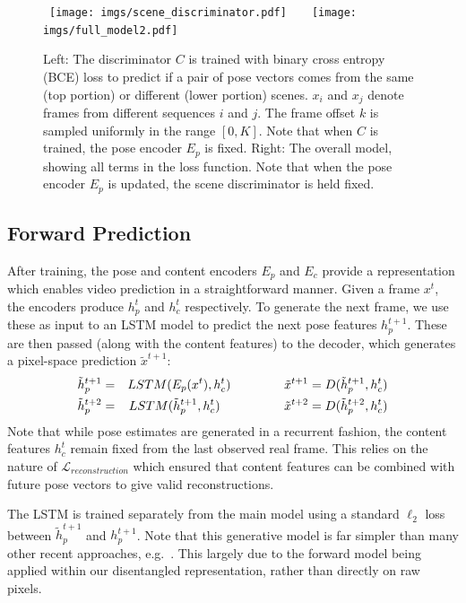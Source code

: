 \documentclass{article}
\newcommand{\rulesep}{\unskip\ \vrule\ }
\begin{document}
\begin{figure}
    \centering
\mbox{
    \texttt{[image: imgs/scene\_discriminator.pdf]}
\rulesep
  \texttt{[image: imgs/full\_model2.pdf]}
 }
 \caption{Left: The discriminator $C$ is trained with binary cross entropy (BCE) loss to predict if a pair of pose vectors comes from the same (top portion) or different (lower portion) scenes. $x_i$ and $x_j$ denote frames from different sequences $i$ and $j$. The frame offset $k$ is sampled uniformly in the range $[0,K]$. Note that when $C$ is trained, the pose encoder $E_p$ is fixed. Right: The overall model, showing all terms in the loss function. Note that when the pose encoder $E_p$ is updated, the scene discriminator is held fixed.}
    \label{fig:model}
\end{figure}\subsection{Forward Prediction}\label{sec:forward}
After training, the pose and content encoders $E_p$ and $E_c$ provide a representation which enables video prediction in a straightforward manner. Given a frame $x^t$, the encoders produce $h^t_p$ and $h^t_c$ respectively. To generate the next frame, we use these as input to an LSTM model to predict the next pose features $h^{t+1}_p$. These are then passed (along with the content features) to the decoder, which generates a pixel-space prediction $\tilde{x}^{t+1}$:
\begin{eqnarray}
\tilde{h}^{t+1}_p &=& LSTM(E_p(x^t), h^t_c) \hspace{15mm}  \tilde{x}^{t+1} = D(\tilde{h}^{t+1}_p ,h^t_c) \\
\tilde{h}^{t+2}_p &=& LSTM(\tilde{h}^{t+1}_p, h^t_c) \hspace{18mm}  \tilde{x}^{t+2} = D(\tilde{h}^{t+2}_p ,h^t_c)
\end{eqnarray}
Note that while pose estimates are generated in a recurrent fashion, the content features $h^t_c$ remain fixed from the last observed real frame. This relies on the nature of $\mathcal{L}_{reconstruction}$ which ensured that content features can be combined with future pose vectors to give valid reconstructions.

The LSTM is trained separately from the main model using a standard $\ell_2$ loss between $\tilde{h}^{t+1}_p$ and $h^{t+1}_p$. Note that this generative model is far simpler than many other recent approaches, e.g.~\cite{Kalchbrenner16}. This largely due to the forward model being applied within our disentangled representation, rather than directly on raw pixels.
\end{document}
